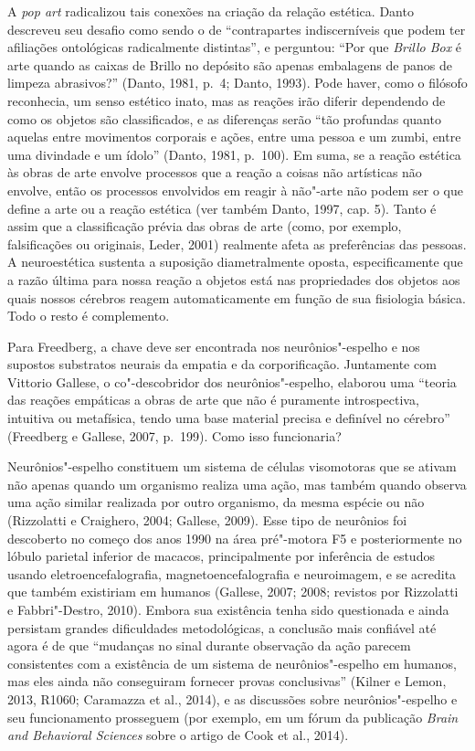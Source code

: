 A \emph{pop art} radicalizou tais conexões na criação da relação
estética. Danto descreveu seu desafio como sendo o de ``contrapartes
indiscerníveis que podem ter afiliações ontológicas radicalmente
distintas'', e perguntou: ``Por que \emph{Brillo Box} é arte quando as
caixas de Brillo no depósito são apenas embalagens de panos de limpeza
abrasivos?'' (Danto, 1981, p.~4; Danto, 1993). Pode haver, como o
filósofo reconhecia, um senso estético inato, mas as reações irão
diferir dependendo de como os objetos são classificados, e as diferenças
serão ``tão profundas quanto aquelas entre movimentos corporais e ações,
entre uma pessoa e um zumbi, entre uma divindade e um ídolo'' (Danto,
1981, p.~100). Em suma, se a reação estética às obras de arte envolve
processos que a reação a coisas não artísticas não envolve, então os
processos envolvidos em reagir à não"-arte não podem ser o que define a
arte ou a reação estética (ver também Danto, 1997, cap. 5). Tanto é
assim que a classificação prévia das obras de arte (como, por exemplo,
falsificações ou originais, Leder, 2001) realmente afeta as preferências
das pessoas. A neuroestética sustenta a suposição diametralmente oposta,
especificamente que a razão última para nossa reação a objetos está nas
propriedades dos objetos aos quais nossos cérebros reagem
automaticamente em função de sua fisiologia básica. Todo o resto é
complemento.

Para Freedberg, a chave deve ser encontrada nos neurônios"-espelho e nos
supostos substratos neurais da empatia e da corporificação. Juntamente
com Vittorio Gallese, o co"-descobridor dos neurônios"-espelho, elaborou
uma ``teoria das reações empáticas a obras de arte que não é puramente
introspectiva, intuitiva ou metafísica, tendo uma base material precisa
e definível no cérebro'' (Freedberg e Gallese, 2007, p.~199). Como isso
funcionaria?

Neurônios"-espelho constituem um sistema de células visomotoras que se
ativam não apenas quando um organismo realiza uma ação, mas também
quando observa uma ação similar realizada por outro organismo, da mesma
espécie ou não (Rizzolatti e Craighero, 2004; Gallese, 2009). Esse tipo
de neurônios foi descoberto no começo dos anos 1990 na área pré"-motora
F5 e posteriormente no lóbulo parietal inferior de macacos,
principalmente por inferência de estudos usando eletroencefalografia,
magnetoencefalografia e neuroimagem, e se acredita que também existiriam
em humanos (Gallese, 2007; 2008; revistos por Rizzolatti e
Fabbri"-Destro, 2010). Embora sua existência tenha sido questionada e
ainda persistam grandes dificuldades metodológicas, a conclusão mais
confiável até agora é de que ``mudanças no sinal  durante observação
da ação parecem consistentes com a existência de um sistema de
neurônios"-espelho em humanos, mas eles ainda não conseguiram fornecer
provas conclusivas'' (Kilner e Lemon, 2013, R1060; Caramazza et al.,
2014), e as discussões sobre neurônios"-espelho e seu funcionamento
prosseguem (por exemplo, em um fórum da publicação \emph{Brain and
Behavioral Sciences} sobre o artigo de Cook et al., 2014).


